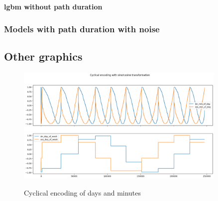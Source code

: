\documentclass[12pt]{article}
\begin{document}
\newpage
\textbf{\acrshort{lgbm} without path duration}


\newpage
\subsubsection*{Models with path duration with noise}

\newpage
\subsection*{Other graphics}

\begin{figure}[h]
    \centering
    \includegraphics[width=0.9\textwidth]{cyclical encoding.png}\\
    \caption{Cyclical encoding of days and minutes}
    \label{fig:Cyclical encoding of days and minutes}
\end{figure}
\FloatBarrier

\newpage
\printglossaries



\newpage
\printbibliography
\end{document}

